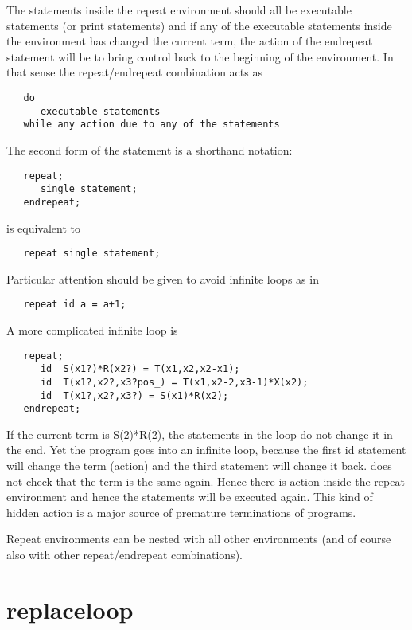 \noindent The statements inside the repeat environment should all be 
executable statements (or print statements) and if any of the executable 
statements inside the environment has changed the current term, the action 
of the endrepeat statement will be to bring control back to the beginning 
of the environment. In that sense the repeat/endrepeat combination acts as
\begin{verbatim}
   do
      executable statements
   while any action due to any of the statements
\end{verbatim}
The second form of the statement is a shorthand notation:
\begin{verbatim}
   repeat;
      single statement;
   endrepeat;
\end{verbatim}
is equivalent to
\begin{verbatim}
   repeat single statement;
\end{verbatim}
Particular attention should be given to avoid infinite 
loops as in
\begin{verbatim}
   repeat id a = a+1;
\end{verbatim}
A more complicated infinite loop is
\begin{verbatim}
   repeat;
      id  S(x1?)*R(x2?) = T(x1,x2,x2-x1);
      id  T(x1?,x2?,x3?pos_) = T(x1,x2-2,x3-1)*X(x2);
      id  T(x1?,x2?,x3?) = S(x1)*R(x2);
   endrepeat;
\end{verbatim}
If the current term is S(2)*R(2), the statements in the loop do not change 
it in the end. Yet the program goes into an infinite loop, because the 
first id statement will change the term (action) and the third statement 
will change it back. {\FORM} does not check that the term is the same 
again. Hence there is action inside the repeat environment and hence the 
statements will be executed again. This kind of hidden action is a major 
source of premature 
terminations of {\FORM} programs. \vspace{4mm}

\noindent Repeat environments can be nested with all other 
environments (and of course also with other repeat/endrepeat combinations). 
\vspace{10mm}


\section{replaceloop}
\label{substareplaceloop}

